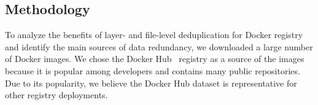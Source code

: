 \subsection{Methodology}
\label{sec:methodology}



%
%

To analyze the benefits of layer- and file-level deduplication for Docker registry
and identify the main sources of data redundancy, we downloaded a large number of
Docker images.
%
We chose the Docker Hub~\cite{docker-hub} registry as a source of the images
because it is popular among developers and contains many public repositories.
%
Due to its popularity, we believe the Docker Hub dataset is representative for
other registry deployments.


